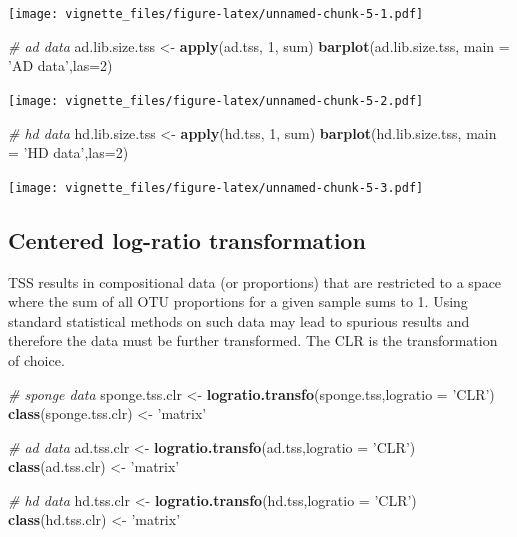 \documentclass[]{book}
\newenvironment{Shaded}{\begin{snugshade}}{\end{snugshade}}
\newcommand{\KeywordTok}[1]{\textcolor[rgb]{0.13,0.29,0.53}{\textbf{#1}}}
\newcommand{\DataTypeTok}[1]{\textcolor[rgb]{0.13,0.29,0.53}{#1}}
\newcommand{\DecValTok}[1]{\textcolor[rgb]{0.00,0.00,0.81}{#1}}
\newcommand{\StringTok}[1]{\textcolor[rgb]{0.31,0.60,0.02}{#1}}
\newcommand{\CommentTok}[1]{\textcolor[rgb]{0.56,0.35,0.01}{\textit{#1}}}
\newcommand{\NormalTok}[1]{#1}
\begin{document}
\texttt{[image: vignette\_files/figure-latex/unnamed-chunk-5-1.pdf]}

\begin{Shaded}
\begin{Highlighting}[]
\CommentTok{# ad data}
\NormalTok{ad.lib.size.tss <-}\StringTok{ }\KeywordTok{apply}\NormalTok{(ad.tss, }\DecValTok{1}\NormalTok{, sum)}
\KeywordTok{barplot}\NormalTok{(ad.lib.size.tss, }\DataTypeTok{main =}  \StringTok{'AD data'}\NormalTok{,}\DataTypeTok{las=}\DecValTok{2}\NormalTok{)}
\end{Highlighting}
\end{Shaded}

\texttt{[image: vignette\_files/figure-latex/unnamed-chunk-5-2.pdf]}

\begin{Shaded}
\begin{Highlighting}[]
\CommentTok{# hd data}
\NormalTok{hd.lib.size.tss <-}\StringTok{ }\KeywordTok{apply}\NormalTok{(hd.tss, }\DecValTok{1}\NormalTok{, sum)}
\KeywordTok{barplot}\NormalTok{(hd.lib.size.tss, }\DataTypeTok{main =}  \StringTok{'HD data'}\NormalTok{,}\DataTypeTok{las=}\DecValTok{2}\NormalTok{)}
\end{Highlighting}
\end{Shaded}

\texttt{[image: vignette\_files/figure-latex/unnamed-chunk-5-3.pdf]}

\subsection{Centered log-ratio
transformation}\label{centered-log-ratio-transformation}

TSS results in compositional data (or proportions) that are restricted
to a space where the sum of all OTU proportions for a given sample sums
to 1. Using standard statistical methods on such data may lead to
spurious results and therefore the data must be further transformed. The
CLR is the transformation of choice.

\begin{Shaded}
\begin{Highlighting}[]
\CommentTok{# sponge data}
\NormalTok{sponge.tss.clr <-}\StringTok{ }\KeywordTok{logratio.transfo}\NormalTok{(sponge.tss,}\DataTypeTok{logratio =} \StringTok{'CLR'}\NormalTok{)}
\KeywordTok{class}\NormalTok{(sponge.tss.clr) <-}\StringTok{ 'matrix'} 

\CommentTok{# ad data}
\NormalTok{ad.tss.clr <-}\StringTok{ }\KeywordTok{logratio.transfo}\NormalTok{(ad.tss,}\DataTypeTok{logratio =} \StringTok{'CLR'}\NormalTok{)}
\KeywordTok{class}\NormalTok{(ad.tss.clr) <-}\StringTok{ 'matrix'} 

\CommentTok{# hd data}
\NormalTok{hd.tss.clr <-}\StringTok{ }\KeywordTok{logratio.transfo}\NormalTok{(hd.tss,}\DataTypeTok{logratio =} \StringTok{'CLR'}\NormalTok{)}
\KeywordTok{class}\NormalTok{(hd.tss.clr) <-}\StringTok{ 'matrix'}
\end{Highlighting}
\end{Shaded}
\end{document}
